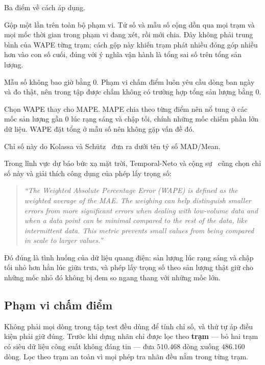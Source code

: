 \documentclass[12pt, a4paper]{report}
\begin{document}
Ba điểm về cách áp dụng.

Gộp một lần trên toàn bộ phạm vi. Tử số và mẫu số cộng dồn qua mọi trạm và mọi mốc
thời gian trong phạm vi đang xét, rồi mới chia. Đây không phải trung bình của WAPE từng trạm;
cách gộp này khiến trạm phát nhiều đóng góp nhiều hơn vào con số cuối, đúng với ý nghĩa vận
hành là tổng sai số trên tổng sản lượng.

Mẫu số không bao giờ bằng $0$. Phạm vi chấm điểm luôn yêu cầu dòng ban ngày và đo
thật, nên trong tập được chấm không có trường hợp tổng sản lượng bằng $0$.

Chọn WAPE thay cho MAPE. MAPE chia theo từng điểm nên nổ tung ở các mốc sản
lượng gần $0$ lúc rạng sáng và chập tối, chính những mốc chiếm phần lớn dữ liệu. WAPE đặt
tổng ở mẫu số nên không gặp vấn đề đó.

Chỉ số này do Kolassa và Schütz~\cite{kolassa2007mad} đưa ra dưới tên tỷ số MAD/Mean.

Trong lĩnh vực dự báo bức xạ mặt trời, Temporal-Neto và cộng sự~\cite{pin2025wape} cũng chọn
chỉ số này và giải thích công dụng của phép lấy trọng số:

\begin{quote}\small
\textit{``The Weighted Absolute Percentage Error (WAPE) is defined as the weighted average of
the MAE. The weighing can help distinguish smaller errors from more significant errors when
dealing with low-volume data and when a data point can be minimal compared to the rest of the
data, like intermittent data. This metric prevents small values from being compared in scale to
larger values.''}
\end{quote}

Đó đúng là tình huống của dữ liệu quang điện: sản lượng lúc rạng sáng và chập tối nhỏ hơn hẳn
lúc giữa trưa, và phép lấy trọng số theo sản lượng thật giữ cho những mốc nhỏ đó không bị đem so
ngang thang với những mốc lớn.


\FloatBarrier
\subsection{Phạm vi chấm điểm}
\label{subsec:pham_vi_cham_diem}

Không phải mọi dòng trong tập test đều dùng để tính chỉ số, và thứ tự áp điều kiện phải giữ
đúng. Trước khi dựng nhãn chỉ được lọc theo \textbf{trạm} --- bỏ hai trạm có siêu dữ liệu công
suất không đáng tin --- đưa $510.468$ dòng xuống $486.160$ dòng. Lọc theo trạm an toàn vì mọi
phép tra nhãn đều nằm trong từng trạm.
\end{document}
